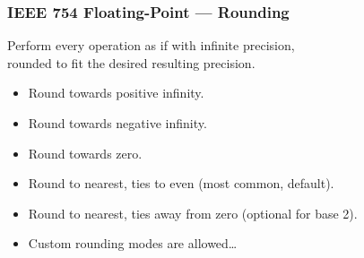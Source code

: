 \begin{frame}[fragile]

\frametitle{IEEE 754 Floating-Point --- Rounding}

\vspace{\fill}

\begin{center}

Perform every operation as if with infinite precision, \\ rounded to fit
the desired resulting precision.

\end{center}

\vspace{\fill}

\footnotesize

\begin{itemize}

\item Round towards positive infinity.

\item Round towards negative infinity.

\item Round towards zero.

\item Round to nearest, ties to even (most common, default).

\item Round to nearest, ties away from zero (optional for base 2).

\item Custom rounding modes are allowed\ldots

\end{itemize}

\vspace{\fill}

\end{frame}
